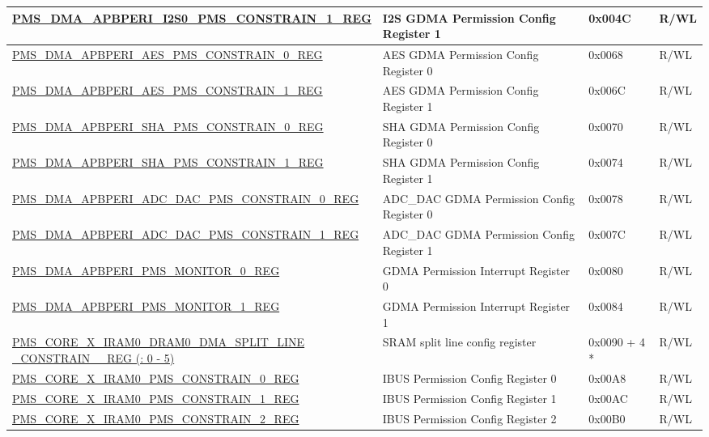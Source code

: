 \begin{longtable}{ | L{9.5cm} | L{7.2cm} | l | L{1.2cm}| }
\hyperref[regdesc:PMSDMAAPBPERII2S0PMSCONSTRAIN1REG]{PMS\_DMA\_APBPERI\_I2S0\_PMS\_CONSTRAIN\_1\_REG} & I2S GDMA Permission Config Register 1 & 0x004C & R/WL \\ \hline
\hyperref[regdesc:PMSDMAAPBPERIAESPMSCONSTRAIN0REG]{PMS\_DMA\_APBPERI\_AES\_PMS\_CONSTRAIN\_0\_REG} & AES GDMA Permission Config Register 0 & 0x0068 & R/WL \\ \hline
\hyperref[regdesc:PMSDMAAPBPERIAESPMSCONSTRAIN1REG]{PMS\_DMA\_APBPERI\_AES\_PMS\_CONSTRAIN\_1\_REG} & AES GDMA Permission Config Register 1 & 0x006C & R/WL \\ \hline
\hyperref[regdesc:PMSDMAAPBPERISHAPMSCONSTRAIN0REG]{PMS\_DMA\_APBPERI\_SHA\_PMS\_CONSTRAIN\_0\_REG} & SHA GDMA Permission Config Register 0 & 0x0070 & R/WL \\ \hline
\hyperref[regdesc:PMSDMAAPBPERISHAPMSCONSTRAIN1REG]{PMS\_DMA\_APBPERI\_SHA\_PMS\_CONSTRAIN\_1\_REG} & SHA GDMA Permission Config Register 1 & 0x0074 & R/WL \\ \hline
\hyperref[regdesc:PMSDMAAPBPERIADCDACPMSCONSTRAIN0REG]{PMS\_DMA\_APBPERI\_ADC\_DAC\_PMS\_CONSTRAIN\_0\_REG} & ADC\_DAC GDMA Permission Config Register 0 & 0x0078 & R/WL \\ \hline
\hyperref[regdesc:PMSDMAAPBPERIADCDACPMSCONSTRAIN1REG]{PMS\_DMA\_APBPERI\_ADC\_DAC\_PMS\_CONSTRAIN\_1\_REG} & ADC\_DAC GDMA Permission Config Register 1 & 0x007C & R/WL \\ \hline
\hyperref[regdesc:PMSDMAAPBPERIPMSMONITOR0REG]{PMS\_DMA\_APBPERI\_PMS\_MONITOR\_0\_REG} & GDMA Permission Interrupt Register 0 & 0x0080 & R/WL \\ \hline
\hyperref[regdesc:PMSDMAAPBPERIPMSMONITOR1REG]{PMS\_DMA\_APBPERI\_PMS\_MONITOR\_1\_REG} & GDMA Permission Interrupt Register 1 & 0x0084 & R/WL \\ \hline
\hyperref[regdesc:PMSCOREXIRAM0DRAM0DMASPLITLINECONSTRAIN0REG]{PMS\_CORE\_X\_IRAM0\_DRAM0\_DMA\_SPLIT\_LINE\newline\_CONSTRAIN\_\_REG (: 0 - 5)} & SRAM split line config register  & 0x0090 + 4 *  & R/WL \\ \hline
\hyperref[regdesc:PMSCOREXIRAM0PMSCONSTRAIN0REG]{PMS\_CORE\_X\_IRAM0\_PMS\_CONSTRAIN\_0\_REG} & IBUS Permission Config Register 0 & 0x00A8 & R/WL \\ \hline
\hyperref[regdesc:PMSCOREXIRAM0PMSCONSTRAIN1REG]{PMS\_CORE\_X\_IRAM0\_PMS\_CONSTRAIN\_1\_REG} & IBUS Permission Config Register 1 & 0x00AC & R/WL \\ \hline
\hyperref[regdesc:PMSCOREXIRAM0PMSCONSTRAIN2REG]{PMS\_CORE\_X\_IRAM0\_PMS\_CONSTRAIN\_2\_REG} & IBUS Permission Config Register 2 & 0x00B0 & R/WL \\ \hline

\end{longtable}
